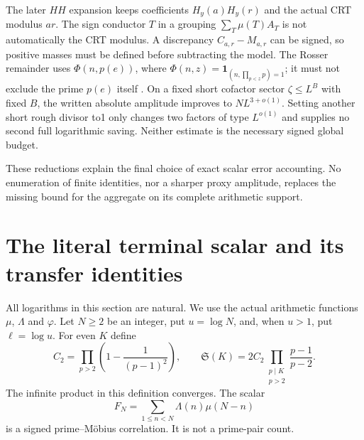 \documentclass[11pt,a4paper]{article}
\theoremstyle{definition}
\theoremstyle{remark}
\newcommand{\ind}{\mathbf1}
\begin{document}
The later $HH$ expansion keeps coefficients $H_y(a)H_y(r)$ and the actual CRT modulus $ar$. The sign conductor $T$ in a grouping $\sum_T\mu(T)A_T$ is not automatically the CRT modulus. A discrepancy $C_{a,r}-M_{a,r}$ can be signed, so positive masses must be defined before subtracting the model. The Rosser remainder uses $\Phi(n,p(e))$, where $\Phi(n,z)=\ind_{(n,\prod_{p<z}p)=1}$; it must not exclude the prime $p(e)$ itself \cite{Motohashi}. On a fixed short cofactor sector $\zeta\le L^B$ with fixed $B$, the written absolute amplitude improves to $NL^{3+o(1)}$. Setting another short rough divisor to1 only changes two factors of type $L^{o(1)}$ and supplies no second full logarithmic saving. Neither estimate is the necessary signed global budget.

These reductions explain the final choice of exact scalar error accounting. No enumeration of finite identities, nor a sharper proxy amplitude, replaces the missing bound for the aggregate on its complete arithmetic support.



\section{The literal terminal scalar and its transfer identities}
\label{sec:terminal-ledger}

All logarithms in this section are natural.  We use the actual arithmetic
functions $\mu$, $\Lambda$ and $\varphi$.  Let $N\geq2$ be an integer,
put $u=\log N$, and, when $u>1$, put $\ell=\log u$.  For even $K$ define
\begin{equation}
 C_2=\prod_{p>2}\left(1-\frac1{(p-1)^2}\right),\qquad
 \mathfrak S(K)=2C_2\prod_{\substack{p\mid K\\p>2}}
                       \frac{p-1}{p-2}.
 \label{eq:sector-singular-definition}
\end{equation}
The infinite product in this definition converges.  The scalar
\begin{equation}
 F_N=\sum_{1\leq n<N}\Lambda(n)\mu(N-n)
 \label{eq:sector-FN}
\end{equation}
is a signed prime--M\"obius correlation.  It is not a prime-pair count.
\end{document}
